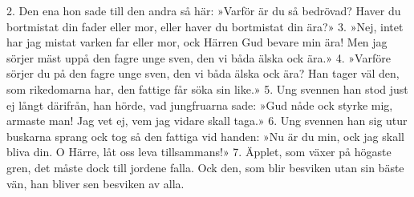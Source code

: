 \begin{adjustwidth}{7mm}{7mm}
2. Den ena hon sade till den andra så här:
   »Varför är du så bedrövad?
   Haver du bortmistat din fader eller mor,
   eller haver du bortmistat din ära?»
3. »Nej, intet har jag mistat varken far eller mor,
   ock Härren Gud bevare min ära!
   Men jag sörjer mäst uppå den fagre unge sven,
   den vi båda älska ock ära.»
4. »Varföre sörjer du på den fagre unge sven,
   den vi båda älska ock ära?
   Han tager väl den, som rikedomarna har,
   den fattige får söka sin like.»
5. Ung svennen han stod just ej långt därifrån,
   han hörde, vad jungfruarna sade:
   »Gud nåde ock styrke mig, armaste man!
   Jag vet ej, vem jag vidare skall taga.»
6. Ung svennen han sig utur buskarna sprang
   ock tog så den fattiga vid handen:
   »Nu är du min, ock jag skall bliva din.
   O Härre, låt oss leva tillsammans!»
7. Äpplet, som växer på högaste gren,
   det måste dock till jordene falla.
   Ock den, som blir besviken utan sin bäste vän,
   han bliver sen besviken av alla.
\end{adjustwidth}
